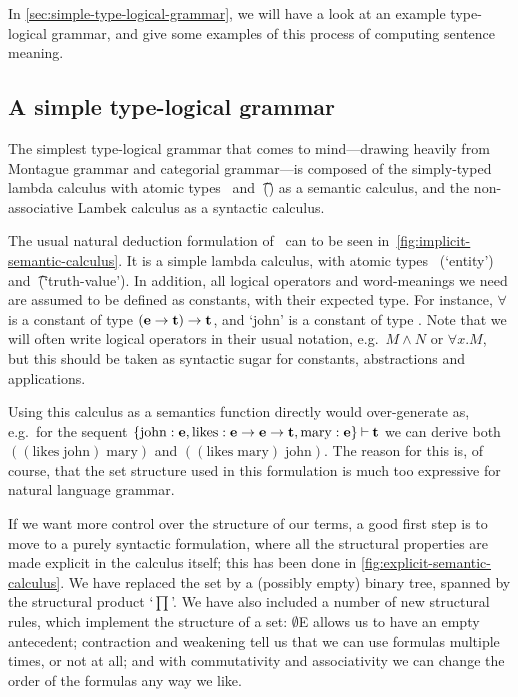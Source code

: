 In \autoref{sec:simple-type-logical-grammar}, we will have a look at
an example type-logical grammar, and give some examples of this
process of computing sentence meaning.



\subsection{A simple type-logical grammar}
\label{sec:simple-type-logical-grammar}

The simplest type-logical grammar that comes to mind---drawing
heavily from Montague grammar and categorial grammar---is composed of
the simply-typed lambda calculus with atomic types \e\ and \t\ (\lamET) as
a semantic calculus, and the non-associative Lambek calculus
\citep[NL;][]{lambek1961} as a syntactic calculus.

The usual natural deduction formulation of \lamET\ can to be seen
in~\autoref{fig:implicit-semantic-calculus}. It is a simple lambda
calculus, with atomic types \e\ (`entity') and \t\ (`truth-value'). In
addition, all logical operators and word-meanings we need are assumed
to be defined as constants, with their expected type. For instance,
$\forall$ is a constant of type $(\mathbf{e}\rightarrow\mathbf{t})\rightarrow\mathbf{t}$, and `john' is a
constant of type \e. Note that we will often write logical operators
in their usual notation, e.g.\ $M\land N$ or $\forall x.M$, but this
should be taken as syntactic sugar for constants, abstractions and
applications.

%

Using this calculus as a semantics function directly would
over-generate as, e.g.\ for the sequent $\{\text{john}:\mathbf{e},
\text{likes}:\mathbf{e}\rightarrow\mathbf{e}\rightarrow\mathbf{t}, \text{mary}:\mathbf{e}\}\mathbin{\vdash}\mathbf{t}$ we can derive
both $((\text{likes}\;\text{john})\;\text{mary})$ and $((\text{likes}\;\text{mary})\;\text{john})$.
The reason for this is, of course, that the set structure used in this
formulation is much too expressive for natural language grammar.

If we want more control over the structure of our terms, a good first
step is to move to a purely syntactic formulation, where all the
structural properties are made explicit in the calculus itself; this
has been done in \autoref{fig:explicit-semantic-calculus}. We have
replaced the set by a (possibly empty) binary tree, spanned by the
structural product `$\prod$'. We have also included a number of new
structural rules, which implement the structure of a set: $\emptyset$E
allows us to have an empty antecedent; contraction and weakening tell
us that we can use formulas multiple times, or not at all; and with
commutativity and associativity we can change the order of the
formulas any way we like.

